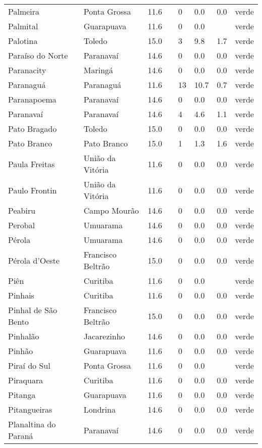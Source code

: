\begin{longtable}{l|lllllll}
  Palmeira & Ponta Grossa & 11.6 &  & 0 & 0.0 & 0.0 & verde \\ 
  Palmital & Guarapuava & 11.6 &  & 0 & 0.0 &  & verde \\ 
  Palotina & Toledo & 15.0 &  & 3 & 9.8 & 1.7 & verde \\ 
  Paraíso do Norte & Paranavaí & 14.6 &  & 0 & 0.0 & 0.0 & verde \\ 
  Paranacity & Maringá & 14.6 &  & 0 & 0.0 & 0.0 & verde \\ 
  Paranaguá & Paranaguá & 11.6 &  & 13 & 10.7 & 0.7 & verde \\ 
  Paranapoema & Paranavaí & 14.6 &  & 0 & 0.0 & 0.0 & verde \\ 
  Paranavaí & Paranavaí & 14.6 &  & 4 & 4.6 & 1.1 & verde \\ 
  Pato Bragado & Toledo & 15.0 &  & 0 & 0.0 & 0.0 & verde \\ 
  Pato Branco & Pato Branco & 15.0 &  & 1 & 1.3 & 1.6 & verde \\ 
  Paula Freitas & União da Vitória & 11.6 &  & 0 & 0.0 & 0.0 & verde \\ 
  Paulo Frontin & União da Vitória & 11.6 &  & 0 & 0.0 & 0.0 & verde \\ 
  Peabiru & Campo Mourão & 14.6 &  & 0 & 0.0 & 0.0 & verde \\ 
  Perobal & Umuarama & 14.6 &  & 0 & 0.0 & 0.0 & verde \\ 
  Pérola & Umuarama & 14.6 &  & 0 & 0.0 & 0.0 & verde \\ 
  Pérola d'Oeste & Francisco Beltrão & 15.0 &  & 0 & 0.0 & 0.0 & verde \\ 
  Piên & Curitiba & 11.6 &  & 0 & 0.0 &  & verde \\ 
  Pinhais & Curitiba & 11.6 &  & 0 & 0.0 & 0.0 & verde \\ 
  Pinhal de São Bento & Francisco Beltrão & 15.0 &  & 0 & 0.0 & 0.0 & verde \\ 
  Pinhalão & Jacarezinho & 14.6 &  & 0 & 0.0 & 0.0 & verde \\ 
  Pinhão & Guarapuava & 11.6 &  & 0 & 0.0 & 0.0 & verde \\ 
  Piraí do Sul & Ponta Grossa & 11.6 &  & 0 & 0.0 &  & verde \\ 
  Piraquara & Curitiba & 11.6 &  & 0 & 0.0 & 0.0 & verde \\ 
  Pitanga & Guarapuava & 11.6 &  & 0 & 0.0 & 0.0 & verde \\ 
  Pitangueiras & Londrina & 14.6 &  & 0 & 0.0 & 0.0 & verde \\ 
  Planaltina do Paraná & Paranavaí & 14.6 &  & 0 & 0.0 & 0.0 & verde \\ 

\end{longtable}
